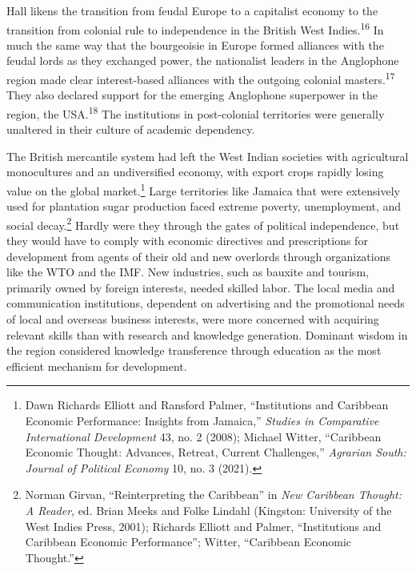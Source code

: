 \documentclass{tufte-handout}
\begin{document}
Hall likens the transition from feudal Europe to a capitalist economy to
the transition from colonial rule to independence in the British West
Indies.\textsuperscript{16} In much the same way that the bourgeoisie in Europe
formed alliances with the feudal lords as they exchanged power, the
nationalist leaders in the Anglophone region made clear interest-based
alliances with the outgoing colonial masters.\textsuperscript{17} They
also declared support for the emerging Anglophone superpower in the
region, the USA.\textsuperscript{18} The
institutions in post-colonial territories were generally unaltered in
their culture of academic dependency.

The British mercantile system had left the West Indian societies with
agricultural monocultures and an undiversified economy, with export
crops rapidly losing value on the global market.\footnote{Dawn Richards
  Elliott and Ransford Palmer, ``Institutions and Caribbean Economic
  Performance: Insights from Jamaica,'' \emph{Studies in Comparative
  International Development} 43, no. 2 (2008); Michael Witter,
  ``Caribbean Economic Thought: Advances, Retreat, Current Challenges,''
  \emph{Agrarian South: Journal of Political Economy} 10, no. 3 (2021).}
Large territories like Jamaica that were extensively used for plantation
sugar production faced extreme poverty, unemployment, and social
decay.\footnote{Norman Girvan, ``Reinterpreting the Caribbean'' in
  \emph{New Caribbean Thought: A Reader}, ed. Brian Meeks and Folke
  Lindahl (Kingston: University of the West Indies Press, 2001);
  Richards Elliott and Palmer, ``Institutions and Caribbean Economic
  Performance''; Witter, ``Caribbean Economic Thought.''} Hardly were
they through the gates of political independence, but they would have to
comply with economic directives and prescriptions for development from
agents of their old and new overlords through organizations like the WTO
and the IMF. New industries, such as bauxite and tourism, primarily
owned by foreign interests, needed skilled labor. The local media and
communication institutions, dependent on advertising and the promotional
needs of local and overseas business interests, were more concerned with
acquiring relevant skills than with research and knowledge generation.
Dominant wisdom in the region considered knowledge transference through
education as the most efficient mechanism for development.
\end{document}
